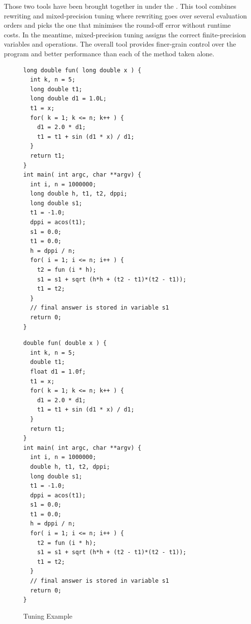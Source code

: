 Those two tools have been brought together in \cite{Darulova2018} under the . This tool combines rewriting and mixed-precision tuning where rewriting goes over several evaluation orders and picks the one that minimises the round-off error without runtime costs. In the meantime, mixed-precision tuning assigns the correct finite-precision variables and operations. The overall tool provides finer-grain control over the program and better performance than each of the method taken alone.
\begin{figure}[htbp]
\centering
\begin{minipage}{.48\textwidth}
\begin{lstlisting}[style=CInputStyle]
long double fun( long double x ) {
  int k, n = 5;
  long double t1;
  long double d1 = 1.0L;
  t1 = x;
  for( k = 1; k <= n; k++ ) {
    d1 = 2.0 * d1;
    t1 = t1 + sin (d1 * x) / d1;
  }
  return t1;
}
int main( int argc, char **argv) {
  int i, n = 1000000;
  long double h, t1, t2, dppi;
  long double s1;
  t1 = -1.0;
  dppi = acos(t1);
  s1 = 0.0;
  t1 = 0.0;
  h = dppi / n;
  for( i = 1; i <= n; i++ ) {
    t2 = fun (i * h);
    s1 = s1 + sqrt (h*h + (t2 - t1)*(t2 - t1));
    t1 = t2;
  }
  // final answer is stored in variable s1
  return 0;
}
\end{lstlisting}
\end{minipage}
\hfill
\begin{minipage}{.48\textwidth}
\begin{lstlisting}[style=CInputStyle]
double fun( double x ) {
  int k, n = 5;
  double t1;
  float d1 = 1.0f;
  t1 = x;
  for( k = 1; k <= n; k++ ) {
    d1 = 2.0 * d1;
    t1 = t1 + sin (d1 * x) / d1;
  }
  return t1;
}
int main( int argc, char **argv) {
  int i, n = 1000000;
  double h, t1, t2, dppi;
  long double s1;
  t1 = -1.0;
  dppi = acos(t1);
  s1 = 0.0;
  t1 = 0.0;
  h = dppi / n;
  for( i = 1; i <= n; i++ ) {
    t2 = fun (i * h);
    s1 = s1 + sqrt (h*h + (t2 - t1)*(t2 - t1));
    t1 = t2;
  }
  // final answer is stored in variable s1
  return 0;
}
\end{lstlisting}
\end{minipage}
\caption[Tuning]{Tuning Example \cite{Rubio2013}}
	\label{fig:Tuning}
\end{figure}

